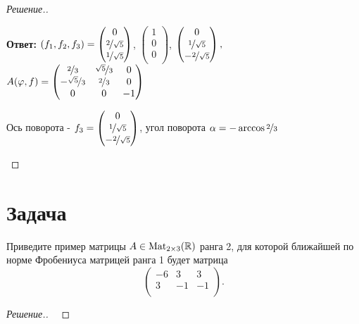 \documentclass[a4paper]{article}
\newcommand{\Mat}{\operatorname{Mat}}
\theoremstyle{remark}
\begin{document}
\begin{proof}[Решение.]
\begin{enumerate}
                \textbf{Ответ:} $(f_1, f_2, f_3) = 
                \begin{pmatrix}
                    0 \\
                    \nicefrac2{\sqrt{5}} \\
                    \nicefrac1{\sqrt{5}}\\
                \end{pmatrix}$, $\begin{pmatrix}
                    1 \\
                    0 \\
                    0\\
                \end{pmatrix}$, 
                $
                \begin{pmatrix}
                    0\\
                    \nicefrac1{\sqrt{5}}\\
                    -\nicefrac2{\sqrt{5}}
                \end{pmatrix}, 
                $
                $A(\varphi, f) = 
                \begin{pmatrix}
                    \nicefrac23 & \nicefrac{\sqrt{5}}{3} & 0 \\
                    -\nicefrac{\sqrt{5}}{3} & \nicefrac23 & 0 \\
                    0 & 0 & -1 \\
                \end{pmatrix} 
                $

                Ось поворота - $f_3 = 
                \begin{pmatrix}
                    0\\
                    \nicefrac1{\sqrt{5}}\\
                    -\nicefrac2{\sqrt{5}}
                \end{pmatrix} 
                $, угол поворота $\alpha = - \arccos{\nicefrac{2}{3}}$
            \end{enumerate}


        \end{proof}

    \section*{Задача }
        Приведите пример матрицы $A \in \Mat_{2\times 3}(\RR)$ ранга 2, для которой 
        ближайшей по норме Фробениуса матрицей ранга 1 будет матрица
        $$
        \begin{pmatrix}
            -6 & 3 & 3 \\
            3 & -1 & -1 \\
        \end{pmatrix}.
        $$
        \begin{proof}[Решение.] \ 
            

        \end{proof}
\end{document}
